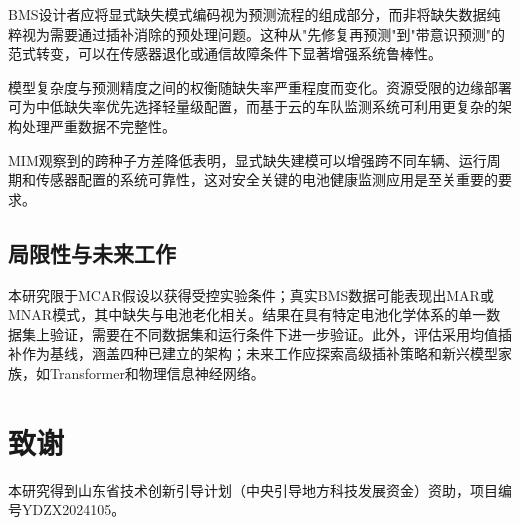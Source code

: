 \documentclass[10pt,a4paper]{ctexart}
\begin{document}
BMS设计者应将显式缺失模式编码视为预测流程的组成部分，而非将缺失数据纯粹视为需要通过插补消除的预处理问题。这种从"先修复再预测"到"带意识预测"的范式转变，可以在传感器退化或通信故障条件下显著增强系统鲁棒性。

模型复杂度与预测精度之间的权衡随缺失率严重程度而变化。资源受限的边缘部署可为中低缺失率优先选择轻量级配置，而基于云的车队监测系统可利用更复杂的架构处理严重数据不完整性。

MIM观察到的跨种子方差降低表明，显式缺失建模可以增强跨不同车辆、运行周期和传感器配置的系统可靠性，这对安全关键的电池健康监测应用是至关重要的要求。

\subsection{局限性与未来工作}\label{sec:future}

本研究限于MCAR假设以获得受控实验条件；真实BMS数据可能表现出MAR或MNAR模式，其中缺失与电池老化相关。结果在具有特定电池化学体系的单一数据集上验证，需要在不同数据集和运行条件下进一步验证。此外，评估采用均值插补作为基线，涵盖四种已建立的架构；未来工作应探索高级插补策略和新兴模型家族，如Transformer和物理信息神经网络。

\section*{致谢}

本研究得到山东省技术创新引导计划（中央引导地方科技发展资金）资助，项目编号YDZX2024105。




\end{document}
